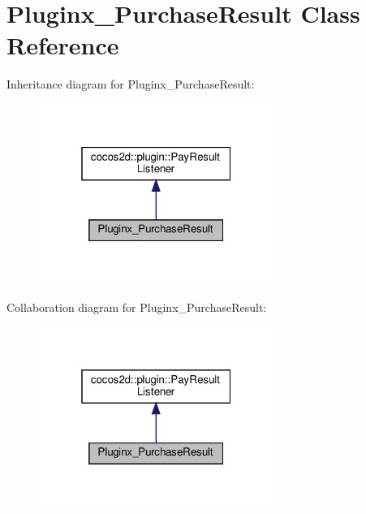 \hypertarget{classPluginx__PurchaseResult}{}\section{Pluginx\+\_\+\+Purchase\+Result Class Reference}
\label{classPluginx__PurchaseResult}


Inheritance diagram for Pluginx\+\_\+\+Purchase\+Result\+:
\nopagebreak
\begin{figure}[H]
\begin{center}
\leavevmode
\includegraphics[width=217pt]{classPluginx__PurchaseResult__inherit__graph}
\end{center}
\end{figure}


Collaboration diagram for Pluginx\+\_\+\+Purchase\+Result\+:
\nopagebreak
\begin{figure}[H]
\begin{center}
\leavevmode
\includegraphics[width=217pt]{classPluginx__PurchaseResult__coll__graph}
\end{center}
\end{figure}
